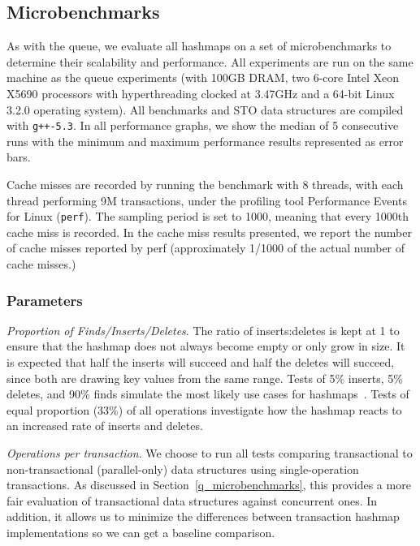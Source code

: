 \subsection{Microbenchmarks}
As with the queue, we evaluate all hashmaps on a set of microbenchmarks to determine their scalability and performance. All experiments are run on the same machine as the queue experiments (with 100GB DRAM, two 6-core Intel Xeon X5690 processors with hyperthreading clocked at 3.47GHz and a 64-bit Linux 3.2.0 operating system). All benchmarks and STO data structures are compiled with \texttt{g++-5.3}. In all performance graphs, we show the median of 5 consecutive runs with the minimum and maximum performance results represented as error bars.

Cache misses are recorded by running the benchmark with 8 threads, with each thread performing 9M transactions, under the profiling tool Performance Events for Linux (\texttt{perf}). The sampling period is set to 1000, meaning that every 1000th cache miss is recorded.
In the cache miss results presented, we report the number of cache misses reported by perf (approximately 1/1000 of the actual number of cache misses.)

\subsubsection{Parameters}

    \emph{Proportion of Finds/Inserts/Deletes}. The ratio of inserts:deletes is kept at 1 to ensure that the hashmap does not always become empty or only grow in size. It is expected that half the inserts will succeed and half the deletes will succeed, since both are drawing key values from the same range. Tests of 5\% inserts, 5\% deletes, and 90\% finds simulate the most likely use cases for hashmaps~\cite{hm1}. Tests of equal proportion (33\%) of all operations investigate how the hashmap reacts to an increased rate of inserts and deletes.

\emph{Operations per transaction}. We choose to run all tests comparing transactional to non-transactional (parallel-only) data structures using single-operation transactions. As discussed in Section~\ref{q_microbenchmarks}, this provides a more fair evaluation of transactional data structures against concurrent ones. In addition, it allows us to minimize the differences between transaction hashmap implementations so we can get a baseline comparison.

